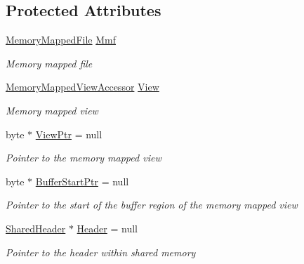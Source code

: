 \subsection*{Protected Attributes}
\begin{DoxyCompactItemize}
\item 
\hyperlink{class_system_1_1_i_o_1_1_memory_mapped_files_1_1_memory_mapped_file}{Memory\+Mapped\+File} \hyperlink{class_shared_memory_1_1_shared_buffer_a10466aaf4679f286101dfe69e187ca18}{Mmf}
\begin{DoxyCompactList}\small\item\em Memory mapped file \end{DoxyCompactList}\item 
\hyperlink{class_system_1_1_i_o_1_1_memory_mapped_files_1_1_memory_mapped_view_accessor}{Memory\+Mapped\+View\+Accessor} \hyperlink{class_shared_memory_1_1_shared_buffer_a8ac57fdf6cb9e181d10f4af066f36d41}{View}
\begin{DoxyCompactList}\small\item\em Memory mapped view \end{DoxyCompactList}\item 
byte $\ast$ \hyperlink{class_shared_memory_1_1_shared_buffer_a9a5712bd63bfd102c3b4776c7431a5cd}{View\+Ptr} = null
\begin{DoxyCompactList}\small\item\em Pointer to the memory mapped view \end{DoxyCompactList}\item 
byte $\ast$ \hyperlink{class_shared_memory_1_1_shared_buffer_a2332338ba9693ee545a34faa7c64483a}{Buffer\+Start\+Ptr} = null
\begin{DoxyCompactList}\small\item\em Pointer to the start of the buffer region of the memory mapped view \end{DoxyCompactList}\item 
\hyperlink{struct_shared_memory_1_1_shared_header}{Shared\+Header} $\ast$ \hyperlink{class_shared_memory_1_1_shared_buffer_a3533d9212c8de47a5ad5d98c3b950c3a}{Header} = null
\begin{DoxyCompactList}\small\item\em Pointer to the header within shared memory \end{DoxyCompactList}\end{DoxyCompactItemize}
